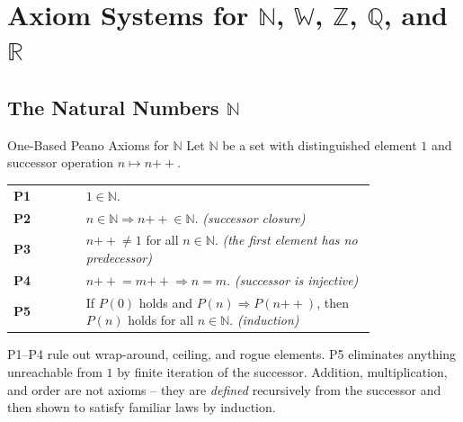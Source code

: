 
\section{Axiom Systems for $\mathbb{N}$, $\mathbb{W}$, $\mathbb{Z}$, $\mathbb{Q}$, and $\mathbb{R}$}
\label{sec:number-systems-axioms}

\subsection*{The Natural Numbers $\mathbb{N}$}

\begin{axiombox}{One-Based Peano Axioms for $\mathbb{N}$}
Let $\mathbb{N}$ be a set with distinguished element $1$
and successor operation $n \mapsto n{+\!\!+}$.

\medskip
\begin{tabular}{@{} l p{0.80\linewidth} @{}}
\textbf{P1} & $1 \in \mathbb{N}$. \\[4pt]
\textbf{P2} & $n \in \mathbb{N} \Rightarrow n{+\!\!+} \in \mathbb{N}$.
             \hfill\textit{(successor closure)} \\[4pt]
\textbf{P3} & $n{+\!\!+} \neq 1$ for all $n \in \mathbb{N}$.
             \hfill\textit{(the first element has no predecessor)} \\[4pt]
\textbf{P4} & $n{+\!\!+} = m{+\!\!+} \Rightarrow n = m$.
             \hfill\textit{(successor is injective)} \\[4pt]
\textbf{P5} & If $P(0)$ holds and $P(n) \Rightarrow P(n{+\!\!+})$,
             then $P(n)$ holds for all $n \in \mathbb{N}$.
             \hfill\textit{(induction)} \\
\end{tabular}
\end{axiombox}

\begin{remark*}
P1--P4 rule out wrap-around, ceiling, and rogue elements.
P5 eliminates anything unreachable from $1$ by finite iteration of the
successor.
Addition, multiplication, and order are not axioms -- they are \emph{defined}
recursively from the successor and then shown to satisfy familiar laws by
induction.
\end{remark*}

